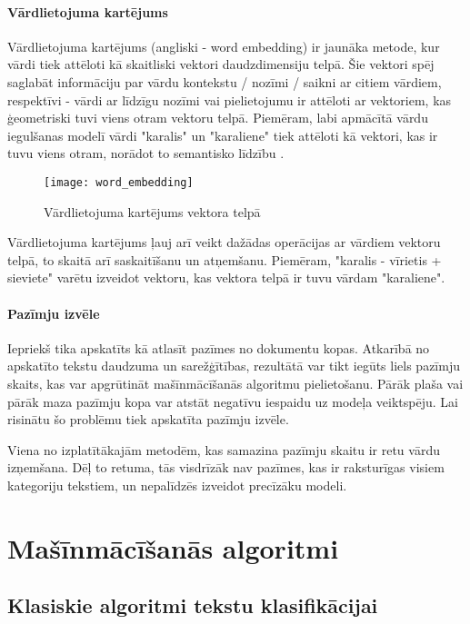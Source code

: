 \subsubsection{Vārdlietojuma kartējums}
Vārdlietojuma kartējums (angliski - word embedding) ir jaunāka metode, kur vārdi tiek attēloti kā skaitliski vektori daudzdimensiju telpā. Šie vektori spēj saglabāt informāciju par vārdu kontekstu / nozīmi / saikni ar citiem vārdiem, respektīvi -  vārdi ar līdzīgu nozīmi vai pielietojumu ir attēloti ar vektoriem, kas ģeometriski tuvi viens otram vektoru telpā. Piemēram, labi apmācītā vārdu iegulšanas modelī vārdi "karalis" un "karaliene" tiek attēloti kā vektori, kas ir tuvu viens otram, norādot to semantisko līdzību \cite{BaeldungEmbedding}.

\begin{figure}[H]
	\texttt{[image: word\_embedding]}
	\caption{Vārdlietojuma kartējums vektora telpā \cite{BaeldungEmbedding} }
	\label{fig:wordembedding}
\end{figure}

Vārdlietojuma kartējums ļauj arī veikt dažādas operācijas ar vārdiem vektoru telpā, to skaitā arī  saskaitīšanu un atņemšanu. Piemēram, "karalis - vīrietis + sieviete" varētu izveidot vektoru, kas vektora telpā ir tuvu vārdam "karaliene".

\subsubsection{Pazīmju izvēle}
Iepriekš tika apskatīts kā atlasīt pazīmes no dokumentu kopas. Atkarībā no apskatīto tekstu daudzuma un sarežģītības, rezultātā var tikt iegūts liels pazīmju skaits, kas var apgrūtināt mašīnmācīšanās algoritmu pielietošanu. Pārāk plaša vai pārāk maza pazīmju kopa var atstāt negatīvu iespaidu uz modeļa veiktspēju. Lai risinātu šo problēmu tiek apskatīta pazīmju izvēle.

Viena no izplatītākajām metodēm, kas samazina pazīmju skaitu ir retu vārdu izņemšana. Dēļ to retuma, tās visdrīzāk nav pazīmes, kas ir raksturīgas visiem kategoriju tekstiem, un nepalīdzēs izveidot precīzāku modeli.

\chapter{Mašīnmācīšanās algoritmi}

\section{Klasiskie algoritmi tekstu klasifikācijai}

